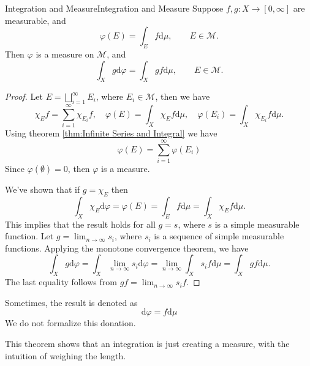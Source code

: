 \documentclass[../main.tex]{subfiles}
\begin{document}
\begin{theorem}{Integration and Measure}{Integration and Measure}
	Suppose $f,g: X \rightarrow [0,\infty ]$ are measurable, and
	\begin{equation}
		\varphi(E) = \int_E f \mathrm{d} \mu, \qquad E\in \mathcal{M}.
	\end{equation}
	Then $\varphi$ is a measure on $\mathcal{M}$, and
	\begin{equation}
		\int_X g \mathrm{d} \varphi = \int_X g f \mathrm{d} \mu, \qquad E\in \mathcal{M}.
	\end{equation}
\end{theorem}
\begin{proof}
Let $E = \bigsqcup_{i=1}^{\infty }E_i$, where $E_i\in \mathcal{M}$, then we have
\begin{equation*}
	\chi_E f = \sum_{i=1}^{\infty } \chi_{E_i} f, \quad \varphi(E) = \int_X \chi_E f \mathrm{d} \mu, \quad \varphi(E_i) = \int_X \chi_{E_i} f \mathrm{d} \mu.
\end{equation*}
Using theorem \ref{thm:Infinite Series and Integral} we have
\begin{equation*}
	\varphi(E) = \sum_{i=1}^{\infty } \varphi(E_i)
\end{equation*}
Since $\varphi(\emptyset )=0$, then $\varphi$ is a measure.

We've shown that if $g=\chi_E$ then
\begin{equation*}
	\int_X \chi_E \mathrm{d} \varphi = \varphi(E) = \int_E f \mathrm{d} \mu = \int_X \chi_E f \mathrm{d} \mu.
\end{equation*}
This implies that the result holds for all $g=s$, where $s$ is a simple measurable function. Let $g = \lim_{n \to \infty } s_i$, where $s_i$ is a sequence of simple measurable functions. Applying the monotone convergence theorem, we have
\begin{equation*}
	\int_X g \mathrm{d} \varphi = \int_X \lim_{n \to \infty } s_i \mathrm{d} \varphi = \lim_{n \to \infty } \int_X s_i f \mathrm{d} \mu = \int_X g f \mathrm{d} \mu.
\end{equation*}
The last equality follows from $gf = \lim_{n \to \infty } s_if$.
\end{proof}

\begin{remark}
Sometimes, the result is denoted as
\begin{equation}
	\mathrm{d} \varphi = f \mathrm{d} \mu
\end{equation}
We do not formalize this donation.

This theorem shows that an integration is just creating a measure, with the intuition of weighing the length.
\end{remark}
\end{document}
